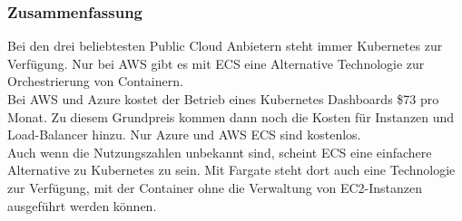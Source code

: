 \newpage
\subsubsection{Zusammenfassung}\label{caas_zusammenfassung}

Bei den drei beliebtesten Public Cloud Anbietern steht immer Kubernetes zur Verfügung.
Nur bei AWS gibt es mit ECS eine Alternative Technologie zur Orchestrierung von Containern. \\

Bei AWS und Azure kostet der Betrieb eines Kubernetes Dashboards \$73 pro Monat.
Zu diesem Grundpreis kommen dann noch die Kosten für Instanzen und Load-Balancer hinzu.
Nur Azure und AWS ECS sind kostenlos. \\

Auch wenn die Nutzungszahlen unbekannt sind, scheint ECS eine einfachere Alternative zu Kubernetes zu sein.
Mit Fargate steht dort auch eine Technologie zur Verfügung, mit der Container ohne die Verwaltung von EC2-Instanzen ausgeführt werden können.

